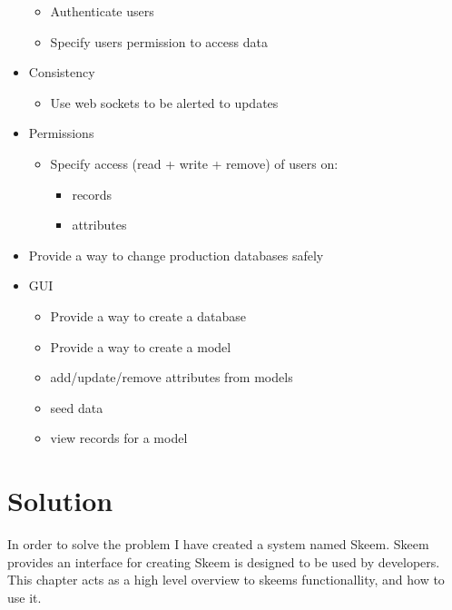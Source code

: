 \documentclass[
  12pt,
]{article}
\providecommand{\tightlist}{%
  \setlength{\itemsep}{0pt}\setlength{\parskip}{0pt}}
\begin{document}
\begin{itemize}
  \begin{itemize}
  \tightlist
  \item
    Authenticate users
  \item
    Specify users permission to access data
  \end{itemize}
\item
  Consistency

  \begin{itemize}
  \tightlist
  \item
    Use web sockets to be alerted to updates
  \end{itemize}
\item
  Permissions

  \begin{itemize}
  \tightlist
  \item
    Specify access (read + write + remove) of users on:

    \begin{itemize}
    \tightlist
    \item
      records
    \item
      attributes
    \end{itemize}
  \end{itemize}
\item
  Provide a way to change production databases safely
\item
  GUI

  \begin{itemize}
  \tightlist
  \item
    Provide a way to create a database
  \item
    Provide a way to create a model
  \item
    add/update/remove attributes from models
  \item
    seed data
  \item
    view records for a model
  \end{itemize}
\end{itemize}

\hypertarget{solution}{%
\section{Solution}\label{solution}}

In order to solve the problem I have created a system named Skeem. Skeem
provides an interface for creating Skeem is designed to be used by
developers. This chapter acts as a high level overview to skeems
functionallity, and how to use it.
\end{document}
